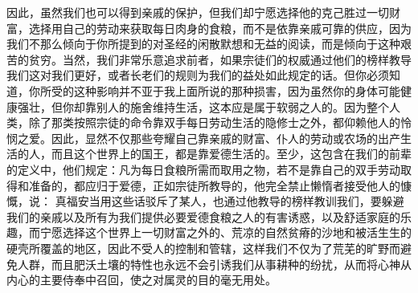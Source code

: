 因此，虽然我们也可以得到亲戚的保护，但我们却宁愿选择他的克己胜过一切财富，选择用自己的劳动来获取每日肉身的食粮，而不是依靠亲戚可靠的供应，因为我们不那么倾向于你所提到的对圣经的闲散默想和无益的阅读，而是倾向于这种艰苦的贫穷。当然，我们非常乐意追求前者，如果宗徒们的权威通过他们的榜样教导我们这对我们更好，或者长老们的规则为我们的益处如此规定的话。但你必须知道，你所受的这种影响并不亚于我上面所说的那种损害，因为虽然你的身体可能健康强壮，但你却靠别人的施舍维持生活，这本应是属于软弱之人的。因为整个人类，除了那类按照宗徒的命令靠双手每日劳动生活的隐修士之外，都仰赖他人的怜悯之爱。因此，显然不仅那些夸耀自己靠亲戚的财富、仆人的劳动或农场的出产生活的人，而且这个世界上的国王，都是靠爱德生活的。至少，这包含在我们的前辈的定义中，他们规定：凡为每日食粮所需而取用之物，若不是靠自己的双手劳动取得和准备的，都应归于爱德，正如宗徒所教导的，他完全禁止懒惰者接受他人的慷慨，说： 真福安当用这些话驳斥了某人，也通过他教导的榜样教训我们，要躲避我们的亲戚以及所有为我们提供必要爱德食粮之人的有害诱惑，以及舒适家庭的乐趣，而宁愿选择这个世界上一切财富之外的、荒凉的自然贫瘠的沙地和被活生生的硬壳所覆盖的地区，因此不受人的控制和管辖，这样我们不仅为了荒芜的旷野而避免人群，而且肥沃土壤的特性也永远不会引诱我们从事耕种的纷扰，从而将心神从内心的主要侍奉中召回，使之对属灵的目的毫无用处。\par


\subsection{}

\par

